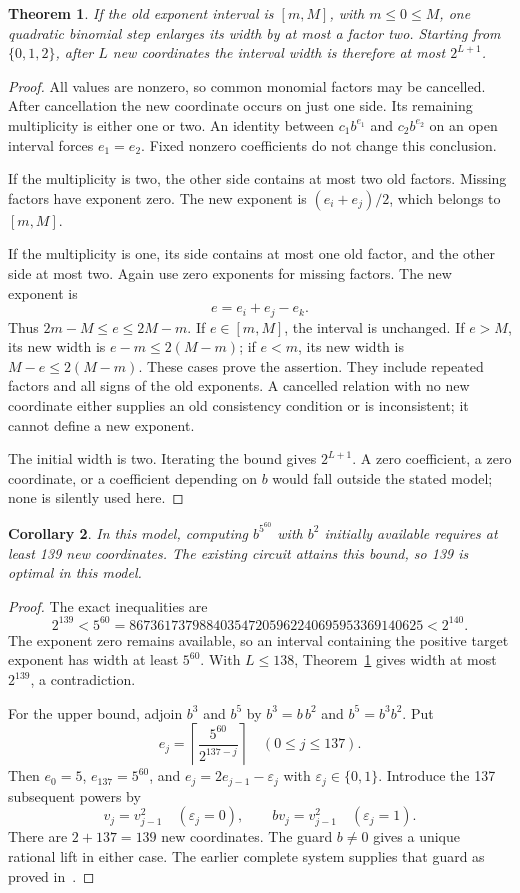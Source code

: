 \documentclass[11pt]{article}
\newtheorem{theorem}{Theorem}
\newtheorem{corollary}[theorem]{Corollary}
\begin{document}
\begin{theorem}\label{width}
If the old exponent interval is $[m,M]$, with $m\le0\le M$, one
quadratic binomial step enlarges its width by at most a factor two.
Starting from $\{0,1,2\}$, after $L$ new coordinates the interval
width is therefore at most $2^{L+1}$.
\end{theorem}
\begin{proof}
All values are nonzero, so common monomial factors may be cancelled.
After cancellation the new coordinate occurs on just one side. Its
remaining multiplicity is either one or two. An identity between
$c_1b^{e_1}$ and $c_2b^{e_2}$ on an open interval forces
$e_1=e_2$. Fixed nonzero coefficients do not change this conclusion.

If the multiplicity is two, the other side contains at most two old
factors. Missing factors have exponent zero. The new exponent is
$(e_i+e_j)/2$, which belongs to $[m,M]$.

If the multiplicity is one, its side contains at most one old factor,
and the other side at most two. Again use zero exponents for missing
factors. The new exponent is
\[
                        e=e_i+e_j-e_k.
\]
Thus $2m-M\le e\le2M-m$. If $e\in[m,M]$, the interval is
unchanged. If $e>M$, its new width is
$e-m\le2(M-m)$; if $e<m$, its new width is
$M-e\le2(M-m)$. These cases prove the assertion. They include
repeated factors and all signs of the old exponents. A cancelled
relation with no new coordinate either supplies an old consistency
condition or is inconsistent; it cannot define a new exponent.

The initial width is two. Iterating the bound gives $2^{L+1}$.
A zero coefficient, a zero coordinate, or a coefficient depending on
$b$ would fall outside the stated model; none is silently used here.
\end{proof}

\begin{corollary}\label{optimal}
In this model, computing $b^{5^{60}}$ with $b^2$ initially available
requires at least 139 new coordinates. The existing circuit attains
this bound, so 139 is optimal in this model.
\end{corollary}
\begin{proof}
The exact inequalities are
\[
 2^{139}<5^{60}=867361737988403547205962240695953369140625<2^{140}.
\]
The exponent zero remains available, so an interval containing the
positive target exponent has width at least $5^{60}$. With $L\le138$,
Theorem~\ref{width} gives width at most $2^{139}$, a contradiction.

For the upper bound, adjoin $b^3$ and $b^5$ by
$b^3=b\,b^2$ and $b^5=b^3b^2$. Put
\[
 e_j=\left\lceil\frac{5^{60}}{2^{137-j}}\right\rceil
 \quad(0\le j\le137).
\]
Then $e_0=5$, $e_{137}=5^{60}$, and
$e_j=2e_{j-1}-\varepsilon_j$ with
$\varepsilon_j\in\{0,1\}$. Introduce the 137 subsequent powers by
\[
 v_j=v_{j-1}^2\quad(\varepsilon_j=0),\qquad
 b v_j=v_{j-1}^2\quad(\varepsilon_j=1).
\]
There are $2+137=139$ new coordinates. The guard $b\ne0$ gives a
unique rational lift in either case. The earlier complete system
supplies that guard as proved in~\cite{ceiling}.
\end{proof}
\end{document}
